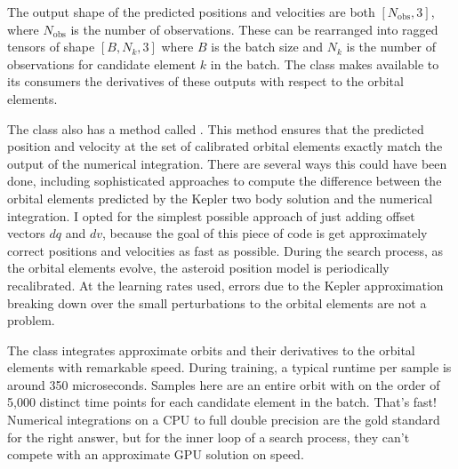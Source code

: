 The output shape of the predicted positions and velocities are both $[N_{\mathrm{obs}}, 3]$, where $N_{\mathrm{obs}}$ is the number of observations.
These can be rearranged into ragged tensors of shape $[B, N_{k}, 3]$ where $B$ is the batch size and $N_{k}$ is the number of observations for 
candidate element $k$ in the batch.
The class makes available to its consumers the derivatives of these outputs with respect to the orbital elements.

The  class also has a method called .
This method ensures that the predicted position and velocity at the set of calibrated orbital elements exactly match the output of the numerical integration.
There are several ways this could have been done, including sophisticated approaches to compute 
the difference between the orbital elements predicted by the Kepler two body solution and the numerical integration.
I opted for the simplest possible approach of just adding offset vectors $dq$ and $dv$,
because the goal of this piece of code is get approximately correct positions and velocities as fast as possible.
During the search process, as the orbital elements evolve, the asteroid position model is periodically recalibrated.
At the learning rates used, errors due to the Kepler approximation breaking down over the small perturbations to the orbital elements are not a problem.

The  class integrates approximate orbits and their derivatives to the orbital elements with remarkable speed.
During training, a typical runtime per sample is around 350 microseconds.
Samples here are an entire orbit with on the order of 5,000 distinct time points for each candidate element in the batch.
That's fast! 
Numerical integrations on a CPU to full double precision are the gold standard for the right answer, 
but for the inner loop of a search process, they can't compete with an approximate GPU solution on speed.